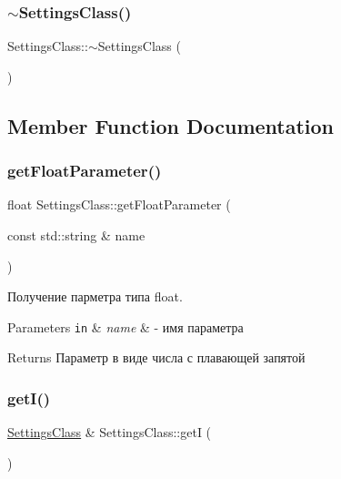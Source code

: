 \subsubsection{\texorpdfstring{$\sim$\+Settings\+Class()}{~SettingsClass()}}
{\footnotesize\ttfamily Settings\+Class\+::$\sim$\+Settings\+Class (\begin{DoxyParamCaption}{ }\end{DoxyParamCaption})\hspace{0.3cm}{\ttfamily [private]}}



\subsection{Member Function Documentation}
\mbox{\label{class_settings_class_a5ab90d79de57f0c7c65ca812d699670a}} 
\subsubsection{\texorpdfstring{get\+Float\+Parameter()}{getFloatParameter()}}
{\footnotesize\ttfamily float Settings\+Class\+::get\+Float\+Parameter (\begin{DoxyParamCaption}\item[{const std\+::string \&}]{name }\end{DoxyParamCaption})}



Получение парметра типа float. 


\begin{DoxyParams}[1]{Parameters}
\mbox{\tt in}  & {\em name} & -\/ имя параметра \\
\hline
\end{DoxyParams}
\begin{DoxyReturn}{Returns}
Параметр в виде числа с плавающей запятой 
\end{DoxyReturn}
\mbox{\label{class_settings_class_a24473783853e6fb498055a1bd44b162d}} 
\subsubsection{\texorpdfstring{get\+I()}{getI()}}
{\footnotesize\ttfamily \hyperlink{class_settings_class}{Settings\+Class} \& Settings\+Class\+::getI (\begin{DoxyParamCaption}{ }\end{DoxyParamCaption})\hspace{0.3cm}{\ttfamily [static]}}



